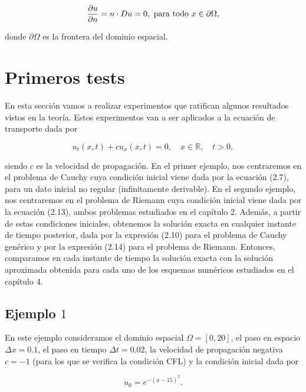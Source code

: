 \begin{equation*}
    \diffp{u}{n}=
    n\cdot Du=
    0,\text{ para todo }x\in\partial\Omega,
\end{equation*}

donde $\partial\Omega$ es la frontera del dominio espacial.

\section{Primeros tests}

En esta sección vamos a realizar experimentos que ratifican algunos
resultados vistos en la teoría.
Estos experimentos van a ser aplicados a la ecuación de transporte
dada por

\begin{equation*}
    u_{t}
    \left(x,t\right)+
    cu_{x}
    \left(x,t\right)=
    0,\quad
    x\in\mathbb{R},\quad
    t>0,
\end{equation*}

siendo $c$ es la velocidad de propagación.
En el primer ejemplo, nos centraremos en el problema de Cauchy cuya
condición inicial viene dada por la ecuación (2.7), para un dato
inicial no regular (infinitamente derivable).
En el segundo ejemplo, nos centraremos en el problema de Riemann cuya
condición inicial viene dada por la ecuación (2.13), ambos problemas
estudiados en el capítulo 2.
Además, a partir de estas condiciones iniciales, obtenemos la
solución exacta en cualquier instante de tiempo posterior, dada por
la expresión (2.10) para el problema de Cauchy genérico y por la
expresión (2.14) para el problema de Riemann.
Entonces, comparamos en cada instante de tiempo la solución exacta
con la solución aproximada obtenida para cada uno de los esquemas
numéricos estudiados en el capítulo 4.

\subsection*{Ejemplo $1$}

En este ejemplo consideramos el dominio espacial
$\Omega=\left[0,20\right]$, el paso en espacio $\Delta x=0.1$, el
paso en tiempo $\Delta t=0.02$, la velocidad de propagación negativa
$c=-1$ (para los que se veriﬁca la condición CFL) y la condición
inicial dada por

\begin{equation*}
    u_{0}=
    e^{-{\left(x-15\right)}^{2}}.
\end{equation*}

